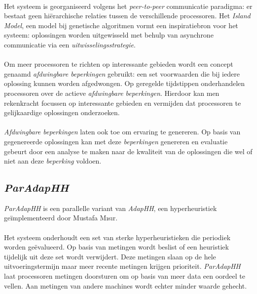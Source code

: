 \paragraph{}
Het systeem is georganiseerd volgens het \emph{peer-to-peer} communicatie paradigma: er bestaat geen hi\"erarchische relaties tussen de verschillende processoren. Het \emph{Island Model}, een model bij genetische algoritmen vormt een inspiratiebron voor het systeem: oplossingen worden uitgewisseld met behulp van asynchrone communicatie via een \emph{uitwisselingsstrategie}.

\paragraph{}
Om meer processoren te richten op interessante gebieden wordt een concept genaamd \emph{afdwingbare beperkingen} gebruikt: een set voorwaarden die bij iedere oplossing kunnen worden afgedwongen. Op geregelde tijdstippen onderhandelen processoren over de actieve \emph{afdwingbare beperkingen}. Hierdoor kan men rekenkracht focussen op interessante gebieden en vermijden dat processoren te gelijkaardige oplossingen onderzoeken.

\paragraph{}
\emph{Afdwingbare beperkingen} laten ook toe om ervaring te genereren. Op basis van gegenereerde oplossingen kan met deze \emph{beperkingen} genereren en evaluatie gebeurt door een analyse te maken naar de kwaliteit van de oplossingen die wel of niet aan deze \emph{beperking} voldoen.

\subsection{\emph{ParAdapHH}}

\emph{ParAdapHH} is een parallelle variant van \emph{AdapHH}, een hyperheuristiek ge\"implementeerd door Mustafa M\i{}s\i{}r.

\paragraph{}
Het systeem onderhoudt een set van sterke hyperheuristieken die periodiek worden ge\"evalueerd. Op basis van metingen wordt beslist of een heuristiek tijdelijk uit deze set wordt verwijdert. Deze metingen slaan op de hele uitvoeringstermijn maar meer recente metingen krijgen prioriteit. \emph{ParAdapHH} laat processoren metingen doorsturen om op basis van meer data een oordeel te vellen. Aan metingen van andere machines wordt echter minder waarde gehecht.

